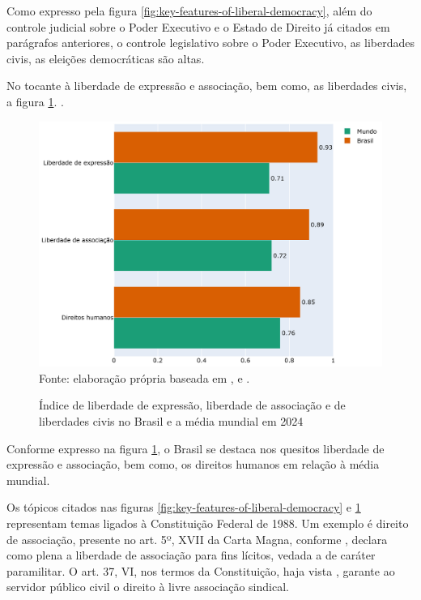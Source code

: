 Como expresso pela figura \ref{fig:key-features-of-liberal-democracy}, além do controle judicial sobre o Poder Executivo e o Estado de Direito já citados em parágrafos anteriores, o controle legislativo sobre o Poder Executivo, as liberdades civis, as eleições democráticas são altas.

No tocante à liberdade de expressão e associação, bem como, as liberdades civis, a figura \ref{fig:comparacao_liberdade_expressao_associacao_dh}.
.
\begin{figure}[H]
	\centering
	\caption{Índice de liberdade de expressão, liberdade de associação e de liberdades civis no Brasil e a média mundial em 2024}
	\includegraphics[width=1\linewidth]{figuras/comparacao_liberdade_expressao_associacao_dh}
	\label{fig:comparacao_liberdade_expressao_associacao_dh}
	\footnotesize{Fonte: elaboração própria baseada em \cite{freedom-of-association-index}, \cite{freedom-of-expression-index} e \cite{human-rights-index-vdem}.}
\end{figure}

Conforme expresso na figura \ref{fig:comparacao_liberdade_expressao_associacao_dh}, o Brasil se destaca nos quesitos liberdade de expressão e associação, bem como, os direitos humanos em relação à média mundial.

Os tópicos citados nas figuras \ref{fig:key-features-of-liberal-democracy} e \ref{fig:comparacao_liberdade_expressao_associacao_dh} representam temas ligados à Constituição Federal de 1988. Um exemplo é direito de associação, presente no art. 5º, XVII da Carta Magna, conforme \cite{cf88}, declara como plena a liberdade de associação para fins lícitos, vedada a de caráter paramilitar. O art. 37, VI, nos termos da Constituição, haja vista \cite{cf88}, garante ao servidor público civil o direito à livre associação sindical.

